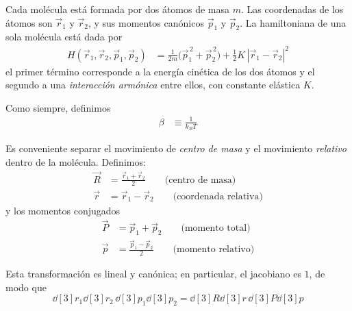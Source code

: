 \documentclass{article}
\begin{document}
Cada molécula está formada por dos átomos de masa \(m\). Las coordenadas de los
átomos son \(\vec r_{1}\) y \(\vec r_{2}\), y sus momentos canónicos \(\vec p_{1}\) y
\(\vec p_{2}\). La hamiltoniana de una sola molécula está dada por
\begin{equation}
\begin{split}
H(\vec r_{1},\vec r_{2},\vec p_{1},\vec p_{2})
&= \frac{1}{2m}\big(\vec p_{1}^{\,2} + \vec p_{2}^{\,2}\big)
   + \frac{1}{2}K\,|\vec r_{1} - \vec r_{2}|^{2}
\end{split}\label{eq:H_molecula_original}
\end{equation}
el primer término corresponde a la energía cinética de los dos átomos
y el segundo a una \emph{interacción armónica} entre ellos, con constante elástica \(K\).

Como siempre, definimos
\begin{equation}
\begin{split}
\beta &\equiv \frac{1}{k_{B}T}
\end{split}\label{eq:def_beta_prob3}
\end{equation}


Es conveniente separar el movimiento de \emph{centro de masa} y el movimiento
\emph{relativo} dentro de la molécula. Definimos:
\begin{equation}
\begin{split}
\vec R &= \frac{\vec r_{1} + \vec r_{2}}{2}
\qquad\text{(centro de masa)}\\[4pt]
\vec r &= \vec r_{1} - \vec r_{2}
\qquad\text{(coordenada relativa)}
\end{split}\label{eq:def_R_r}
\end{equation}
y los momentos conjugados
\begin{equation}
\begin{split}
\vec P &= \vec p_{1} + \vec p_{2}
\qquad\text{(momento total)}\\[4pt]
\vec p &= \frac{\vec p_{1} - \vec p_{2}}{2}
\qquad\text{(momento relativo)}
\end{split}\label{eq:def_P_p}
\end{equation}

Esta transformación es lineal y canónica; en particular, el jacobiano es \(1\), de
modo que
\[
\dd[3]{r_{1}}\dd[3]{r_{2}}\,\dd[3]{p_{1}}\dd[3]{p_{2}}
= \dd[3]{R}\dd[3]{r}\,\dd[3]{P}\dd[3]{p}
\]
\end{document}
